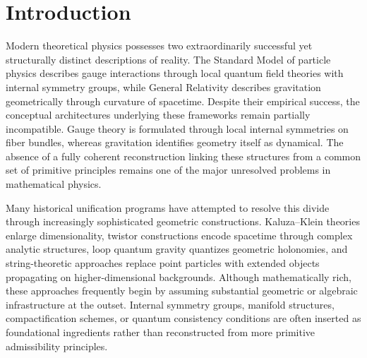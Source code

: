 \documentclass[12pt,a4paper]{article}
\begin{document}
\begin{abstract}
The framework does not claim a completed derivation of the Standard Model or
gravity. It establishes a mathematically structured reconstruction program
clarifying which portions of unification can presently be treated rigorously,
which require additional assumptions, and which remain open conjectures. A
summary of explicit proof obligations is provided. The framework developed below
should be interpreted as a structured derivation program with explicit
unresolved proof obligations rather than as a completed unified theory.
\end{abstract}

\newpage
\tableofcontents
\newpage

\section{Introduction}

Modern theoretical physics possesses two extraordinarily successful yet
structurally distinct descriptions of reality. The Standard Model of particle
physics describes gauge interactions through local quantum field theories with
internal symmetry groups, while General Relativity describes gravitation
geometrically through curvature of spacetime. Despite their empirical success,
the conceptual architectures underlying these frameworks remain partially
incompatible. Gauge theory is formulated through local internal symmetries on
fiber bundles, whereas gravitation identifies geometry itself as dynamical. The
absence of a fully coherent reconstruction linking these structures from a
common set of primitive principles remains one of the major unresolved problems
in mathematical physics.

Many historical unification programs have attempted to resolve this divide
through increasingly sophisticated geometric constructions. Kaluza--Klein
theories enlarge dimensionality, twistor constructions encode spacetime through
complex analytic structures, loop quantum gravity quantizes geometric holonomies,
and string-theoretic approaches replace point particles with extended objects
propagating on higher-dimensional backgrounds. Although mathematically rich,
these approaches frequently begin by assuming substantial geometric or algebraic
infrastructure at the outset. Internal symmetry groups, manifold structures,
compactification schemes, or quantum consistency conditions are often inserted as
foundational ingredients rather than reconstructed from more primitive
admissibility principles.
\end{document}
